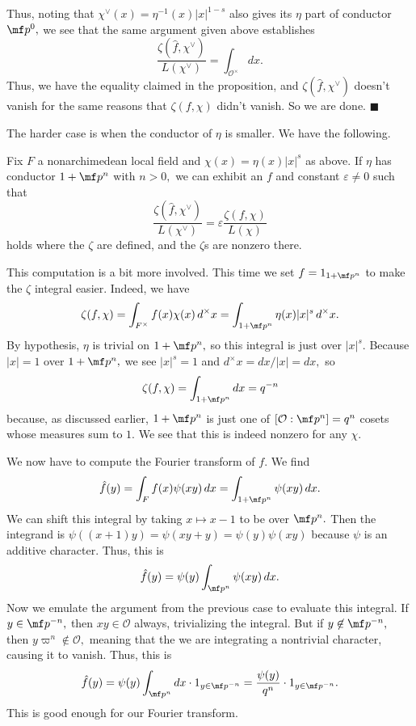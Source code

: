 Thus, noting that $\chi^\vee(x)=\eta^{-1}(x)|x|^{1-s}$ also gives its $\eta$ part of conductor $\mf p^0,$ we see that the same argument given above establishes
\[\frac{\zeta(\hat f,\chi^\vee)}{L(\chi^\vee)}=\int_{\mathcal O^\times}dx.\]
Thus, we have the equality claimed in the proposition, and $\zeta(\hat f,\chi^\vee)$ doesn't vanish for the same reasons that $\zeta(f,\chi)$ didn't vanish. So we are done. $\blacksquare$

The harder case is when the conductor of $\eta$ is smaller. We have the following.
\begin{proposition}
    Fix $F$ a nonarchimedean local field and $\chi(x)=\eta(x)|x|^s$ as above. If $\eta$ has conductor $1+\mf p^n$ with $n>0,$ we can exhibit an $f$ and constant $\varepsilon\ne0$ such that
    \[\frac{\zeta(\hat f,\chi^\vee)}{L(\chi^\vee)}=\varepsilon\frac{\zeta(f,\chi)}{L(\chi)}\]
    holds where the $\zeta$ are defined, and the $\zeta$s are nonzero there.
\end{proposition}
This computation is a bit more involved. This time we set $f=1_{1+\mf p^n}$ to make the $\zeta$ integral easier. Indeed, we have
\[\zeta(f,\chi)=\int_{F^\times}f(x)\chi(x)\,d^\times x=\int_{1+\mf p^n}\eta(x)|x|^s\,d^\times x.\]
By hypothesis, $\eta$ is trivial on $1+\mf p^n,$ so this integral is just over $|x|^s.$ Because $|x|=1$ over $1+\mf p^n,$ we see $|x|^s=1$ and $d^\times x=dx/|x|=dx,$ so
\[\zeta(f,\chi)=\int_{1+\mf p^n}dx=q^{-n}\]
because, as discussed earlier, $1+\mf p^n$ is just one of $\left[\mathcal O:\mf p^n\right]=q^n$ cosets whose measures sum to $1.$ We see that this is indeed nonzero for any $\chi.$

We now have to compute the Fourier transform of $f.$ We find
\[\hat f(y)=\int_Ff(x)\psi(xy)\,dx=\int_{1+\mf p^n}\psi(xy)\,dx.\]
We can shift this integral by taking $x\mapsto x-1$ to be over $\mf p^n.$ Then the integrand is $\psi((x+1)y)=\psi(xy+y)=\psi(y)\psi(xy)$ because $\psi$ is an additive character. Thus, this is
\[\hat f(y)=\psi(y)\int_{\mf p^n}\psi(xy)\,dx.\]
Now we emulate the argument from the previous case to evaluate this integral. If $y\in\mf p^{-n},$ then $xy\in\mathcal O$ always, trivializing the integral. But if $y\not\in\mf p^{-n},$ then $y\varpi^n\not\in\mathcal O,$ meaning that the we are integrating a nontrivial character, causing it to vanish. Thus, this is
\[\hat f(y)=\psi(y)\int_{\mf p^n}dx\cdot1_{y\in\mf p^{-n}}=\frac{\psi(y)}{q^n}\cdot1_{y\in\mf p^{-n}}.\]
This is good enough for our Fourier transform.

